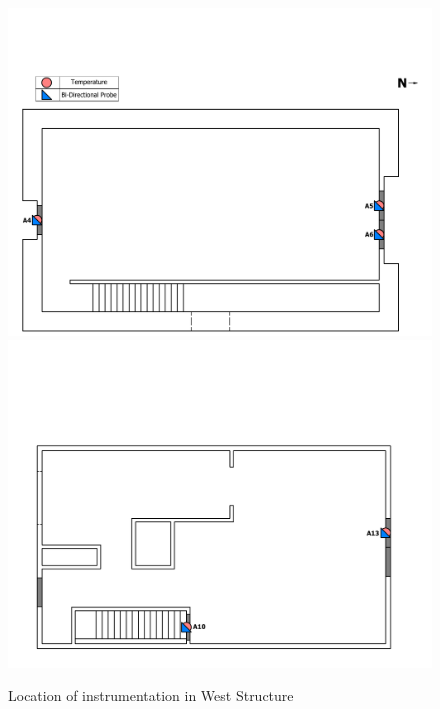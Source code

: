 \documentclass[12pt,oneside]{book}
\begin{document}
\begin{figure}[!ht]
\includegraphics[trim=0cm 0cm 0.75cm 4.5cm, clip=true, width=6in]{../Drawings/Instrumentation/West_Test_Structure_Devices_Hose_Test_1st_Floor}
\\
\includegraphics[trim=0cm 0cm 0.75cm 5.0cm, clip=true, width=6in]{../Drawings/Instrumentation/West_Test_Structure_Devices_Hose_Test_2nd_Floor}
\caption[Location of Instrumentation in West Structure]{Location of instrumentation in West Structure}
\label{fig:west_devices}
\end{figure}

\clearpage
\end{document}

